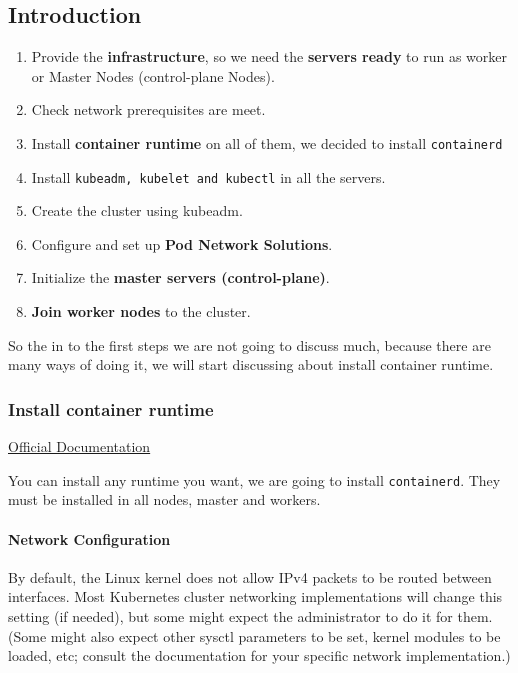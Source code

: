 \documentclass{article}
\begin{document}
\subsection{Introduction}
\begin{enumerate}
    \item Provide the \textbf{infrastructure}, so we need the \textbf{servers ready} to run as worker or Master Nodes (control-plane Nodes).
    \item Check network prerequisites are meet.
    \item Install \textbf{container runtime} on all of them, we decided to install \verb|containerd|
    \item Install \verb|kubeadm, kubelet and kubectl| in all the servers.
    \item Create the cluster using kubeadm.
    \item Configure and set up \textbf{Pod Network Solutions}.
    \item Initialize the \textbf{master servers (control-plane)}.
    \item \textbf{Join worker nodes} to the cluster.
\end{enumerate}

So the in to the first steps we are not going to discuss much, because there are many ways of doing it, we will start discussing about install container runtime.

\subsubsection{Install container runtime}
\href{https://kubernetes.io/docs/setup/production-environment/container-runtimes/}{Official Documentation}

You can install any runtime you want, we are going to install \verb|containerd|. They must be installed in all nodes, master and workers.

\paragraph{Network Configuration}
By default, the Linux kernel does not allow IPv4 packets to be routed between interfaces. Most Kubernetes cluster networking implementations will change this setting (if needed), but some might expect the administrator to do it for them. (Some might also expect other sysctl parameters to be set, kernel modules to be loaded, etc; consult the documentation for your specific network implementation.)
\end{document}
